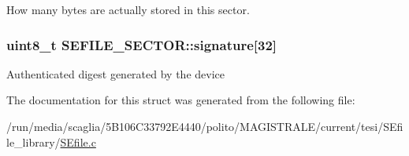 How many bytes are actually stored in this sector. \hypertarget{struct_s_e_f_i_l_e___s_e_c_t_o_r_a111b909efca8a7c55f22c621c81e4cb5}{
\subsubsection[{signature}]{\setlength{\rightskip}{0pt plus 5cm}uint8\-\_\-t S\-E\-F\-I\-L\-E\-\_\-\-S\-E\-C\-T\-O\-R\-::signature\mbox{[}32\mbox{]}}}\label{struct_s_e_f_i_l_e___s_e_c_t_o_r_a111b909efca8a7c55f22c621c81e4cb5}
Authenticated digest generated by the device 

The documentation for this struct was generated from the following file\-:\begin{DoxyCompactItemize}
\item 
/run/media/scaglia/5\-B106\-C33792\-E4440/polito/\-M\-A\-G\-I\-S\-T\-R\-A\-L\-E/current/tesi/\-S\-Efile\-\_\-library/\hyperlink{_s_efile_8c}{S\-Efile.\-c}\end{DoxyCompactItemize}
